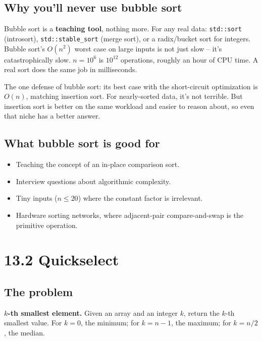 \documentclass[11pt]{article}
\begin{document}
\subsection*{Why you'll never use bubble sort}

\begin{warnbox}
Bubble sort is a \textbf{teaching tool}, nothing more. For any real data: \texttt{std::sort} (introsort), \texttt{std::stable\_sort} (merge sort), or a radix/bucket sort for integers. Bubble sort's $O(n^2)$ worst case on large inputs is not just slow -- it's catastrophically slow. $n = 10^6$ is $10^{12}$ operations, roughly an hour of CPU time. A real sort does the same job in milliseconds.
\end{warnbox}

\begin{notebox}
The one defense of bubble sort: its best case with the short-circuit optimization is $O(n)$, matching insertion sort. For nearly-sorted data, it's not terrible. But insertion sort is better on the same workload and easier to reason about, so even that niche has a better answer.
\end{notebox}

\subsection*{What bubble sort is good for}

\begin{itemize}[leftmargin=*]
    \item Teaching the concept of an in-place comparison sort.
    \item Interview questions about algorithmic complexity.
    \item Tiny inputs ($n \leq 20$) where the constant factor is irrelevant.
    \item Hardware sorting networks, where adjacent-pair compare-and-swap is the primitive operation.
\end{itemize}

\section{13.2 Quickselect}

\subsection*{The problem}

\begin{defnbox}
\textbf{$k$-th smallest element.} Given an array and an integer $k$, return the $k$-th smallest value. For $k=0$, the minimum; for $k = n-1$, the maximum; for $k = n/2$, the median.
\end{defnbox}
\end{document}
